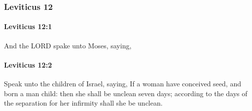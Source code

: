 	\subsubsection{Leviticus 12} %
		\label{LEVITICUS-12}

		\paragraph{Leviticus 12:1} %
			\label{LEVITICUS-12-1}

			And the LORD spake unto Moses, saying,


		\paragraph{Leviticus 12:2} %
			\label{LEVITICUS-12-2}

			Speak unto the children of Israel, saying, If a woman have conceived seed, and born a man child: then she shall be unclean seven days; according to the days of the separation for her infirmity shall she be unclean.


